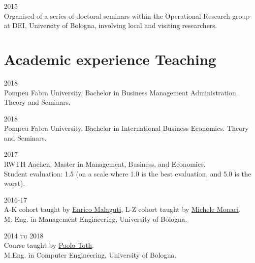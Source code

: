 \begin{paracol}{2}
  \textsc{2015}
\switchcolumn
  \\
  Organised of a series of doctoral seminars within the Operational Research group at DEI, University of Bologna, involving local and visiting researchers.
\end{paracol}

\section*{Academic experience {\small Teaching}}

\begin{paracol}{2}
  \textsc{2018}
\switchcolumn
  \\
  Pompeu Fabra University, Bachelor in Business Management Administration. Theory and Seminars.
\end{paracol}

\begin{paracol}{2}
  \textsc{2018}
\switchcolumn
  \\
  Pompeu Fabra University, Bachelor in International Business Economics. Theory and Seminars.
\end{paracol}

\begin{paracol}{2}
  \textsc{2017}
\switchcolumn
  \\
  RWTH Aachen, Master in Management, Business, and Economics.\\
  Student evaluation: 1.5 (on a scale where 1.0 is the best evaluation, and 5.0 is the worst).
\end{paracol}

\begin{paracol}{2}
  \textsc{2016-17}
\switchcolumn
  \\
  A-K cohort taught by \href{https://scholar.google.com/citations?user=3nD4vYkAAAAJ}{Enrico Malaguti}, L-Z cohort taught by \href{https://scholar.google.com/citations?user=wORMYBMAAAAJ}{Michele Monaci}.\\
  M. Eng. in Management Engineering, University of Bologna.
\end{paracol}

\begin{paracol}{2}
  \textsc{2014 to 2018}
\switchcolumn
  \\
  Course taught by \href{https://scholar.google.com/citations?user=2IPL4XIAAAAJ}{Paolo Toth}.\\
  M.Eng. in Computer Engineering, University of Bologna.
\end{paracol}

